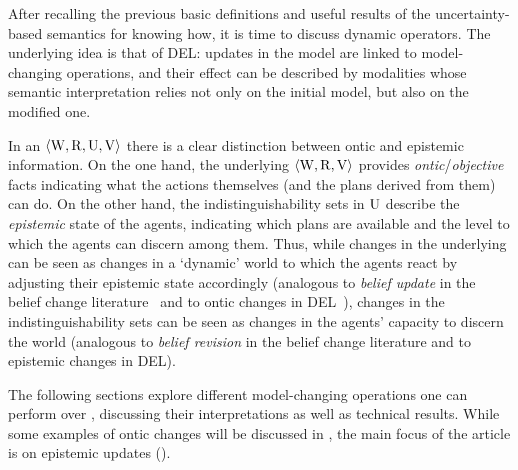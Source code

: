 \medskip

After recalling the previous basic definitions and useful results of the uncertainty-based semantics for knowing how, it is time to discuss dynamic operators. The underlying idea is that of DEL: updates in the model are linked to model-changing operations, and their effect can be described by modalities whose semantic interpretation relies not only on the initial model, but also on the modified one. 

In an \ults $\langle \operatorname{W},\operatorname{R},\operatorname{U},\operatorname{V} \rangle$ there is a clear distinction between ontic and epistemic information. On the one hand, the underlying \lts $\langle \operatorname{W},\operatorname{R},\operatorname{V} \rangle$ provides \emph{ontic}/\emph{objective} facts indicating what the actions themselves (and the plans derived from them) can do. On the other hand, the indistinguishability sets in $\operatorname{U}$ describe the \emph{epistemic} state of the agents, indicating which plans are available and the level to which the agents can discern among them. Thus, while changes in the underlying \lts can be seen as changes in a `dynamic' world to which the agents react by adjusting their epistemic state accordingly (analogous to  \emph{belief update} in the belief change literature~\cite{sep-logic-belief-revision} and to ontic changes in DEL~\cite{vanDitmarschKooi2008}), changes in the indistinguishability sets can be seen as changes in the agents' capacity to discern the world (analogous to \emph{belief revision} in the belief change literature and to epistemic changes in DEL).

The following sections explore different model-changing operations one can perform over \ultss, discussing their interpretations as well as technical results. While some examples of ontic changes will be discussed in , the main focus of the article is on epistemic updates ().





